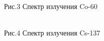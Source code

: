 \documentclass[12pt,a4paper]{article}
\begin{document}
\begin{figure}[H]
\begin{minipage}[h]{0.45\linewidth}
 Рис.3 Спектр излучения Co-60\\
\end{minipage}
\hfill
\begin{minipage}[h]{0.45\linewidth}
 \\ Рис.4 Спектр излучения Cs-137
\end{minipage}
\end{figure}
\end{document}
